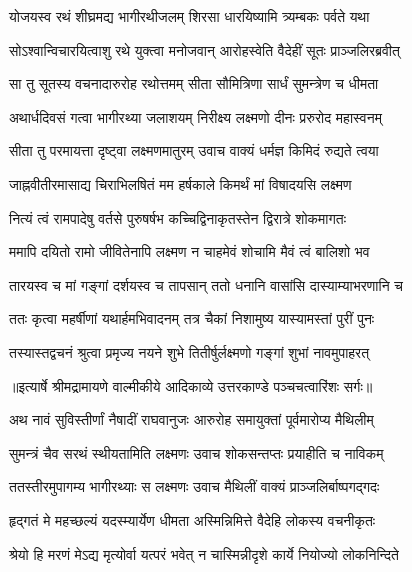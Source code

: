 \twolineshloka
{योजयस्व रथं शीघ्रमद्य भागीरथीजलम्}
{शिरसा धारयिष्यामि त्र्यम्बकः पर्वते यथा} %

\twolineshloka
{सोऽश्वान्विचारयित्वाशु रथे युक्त्वा मनोजवान्}
{आरोहस्वेति वैदेहीं सूतः प्राञ्जलिरब्रवीत्} %

\twolineshloka
{सा तु सूतस्य वचनादारुरोह रथोत्तमम्}
{सीता सौमित्रिणा सार्धं सुमन्त्रेण च धीमता} %

\twolineshloka
{अथार्धदिवसं गत्वा भागीरथ्या जलाशयम्}
{निरीक्ष्य लक्ष्मणो दीनः प्ररुरोद महास्वनम्} %

\twolineshloka
{सीता तु परमायत्ता दृष्ट्वा लक्ष्मणमातुरम्}
{उवाच वाक्यं धर्मज्ञ किमिदं रुद्यते त्वया} %

\twolineshloka
{जाह्नवीतीरमासाद्य चिराभिलषितं मम}
{हर्षकाले किमर्थं मां विषादयसि लक्ष्मण} %

\twolineshloka
{नित्यं त्वं रामपादेषु वर्तसे पुरुषर्षभ}
{कच्चिद्विनाकृतस्तेन द्विरात्रे शोकमागतः} %

\twolineshloka
{ममापि दयितो रामो जीवितेनापि लक्ष्मण}
{न चाहमेवं शोचामि मैवं त्वं बालिशो भव} %

\twolineshloka
{तारयस्व च मां गङ्गां दर्शयस्व च तापसान्}
{ततो धनानि वासांसि दास्याम्याभरणानि च} %

\twolineshloka
{ततः कृत्वा महर्षीणां यथार्हमभिवादनम्}
{तत्र चैकां निशामुष्य यास्यामस्तां पुरीं पुनः} %

\twolineshloka
{तस्यास्तद्वचनं श्रुत्वा प्रमृज्य नयने शुभे}
{तितीर्षुर्लक्ष्मणो गङ्गां शुभां नावमुपाहरत्} %


{॥इत्यार्षे श्रीमद्रामायणे वाल्मीकीये आदिकाव्ये उत्तरकाण्डे पञ्चचत्वारिंशः सर्गः॥}


\twolineshloka
{अथ नावं सुविस्तीर्णां नैषादीं राघवानुजः}
{आरुरोह समायुक्तां पूर्वमारोप्य मैथिलीम्} %

\twolineshloka
{सुमन्त्रं चैव सरथं स्थीयतामिति लक्ष्मणः}
{उवाच शोकसन्तप्तः प्रयाहीति च नाविकम्} %

\twolineshloka
{ततस्तीरमुपागम्य भागीरथ्याः स लक्ष्मणः}
{उवाच मैथिलीं वाक्यं प्राञ्जलिर्बाष्पगद्गदः} %

\twolineshloka
{हृद्गतं मे महच्छल्यं यदस्म्यार्येण धीमता}
{अस्मिन्निमित्ते वैदेहि लोकस्य वचनीकृतः} %

\twolineshloka
{श्रेयो हि मरणं मेऽद्य मृत्योर्वा यत्परं भवेत्}
{न चास्मिन्नीदृशे कार्ये नियोज्यो लोकनिन्दिते} %

